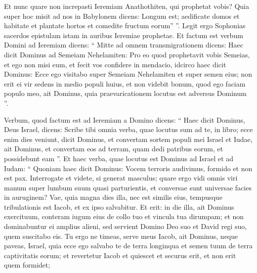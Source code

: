 \begin{biblechapter}
\begin{biblechapter}
\begin{biblechapter}
\begin{biblechapter}
\begin{biblechapter}
\begin{biblechapter}
\begin{biblechapter}
\begin{biblechapter}
\begin{biblechapter}
\begin{biblechapter}
\begin{biblechapter}
\begin{biblechapter}
\begin{biblechapter}
\begin{biblechapter}
\begin{biblechapter}
\begin{biblechapter}
\begin{biblechapter}
\begin{biblechapter}
\begin{biblechapter}
\begin{biblechapter}
\begin{biblechapter}
\begin{biblechapter}
\begin{biblechapter}
\begin{biblechapter}
\begin{biblechapter}
\begin{biblechapter}
\begin{biblechapter}
\begin{biblechapter}
\begin{biblechapter}
\verse Et nunc quare non increpasti Ieremiam Anathothiten, qui prophetat vobis? 
\verse Quia super hoc misit ad nos in Babylonem dicens: Longum est; aedificate domos et habitate et plantate hortos et comedite fructum eorum” ”.
 \verse Legit ergo Sophonias sacerdos epistulam istam in auribus Ieremiae prophetae. 
\verse Et factum est verbum Domini ad Ieremiam dicens: 
\verse “ Mitte ad omnem transmigrationem dicens: Haec dicit Dominus ad Semeiam Nehelamiten: Pro eo quod prophetavit vobis Semeias, et ego non misi eum, et fecit vos confidere in mendacio, 
\verse idcirco haec dicit Dominus: Ecce ego visitabo super Semeiam Nehelamiten et super semen eius; non erit ei vir sedens in medio populi huius, et non videbit bonum, quod ego faciam populo meo, ait Dominus, quia praevaricationem locutus est adversus Dominum ”.
 
\begin{biblechapter}
\verse Verbum, quod factum est ad Ieremiam a Domino dicens: 
\verse “ Haec dicit Dominus, Deus Israel, dicens: Scribe tibi omnia verba, quae locutus sum ad te, in libro; 
\verse ecce enim dies veniunt, dicit Dominus, et convertam sortem populi mei Israel et Iudae, ait Dominus, et convertam eos ad terram, quam dedi patribus eorum, et possidebunt eam ”. 
\verse Et haec verba, quae locutus est Dominus ad Israel et ad Iudam:
 \verse “ Quoniam haec dicit Dominus:
 Vocem terroris audivimus,
 formido et non est pax.
 \verse Interrogate et videte, si generat masculus;
 quare ergo vidi omnis viri manum
 super lumbum suum quasi parturientis,
 et conversae sunt universae facies in auruginem?
 \verse Vae, quia magna dies illa,
 nec est similis eius,
 tempusque tribulationis est Iacob,
 et ex ipso salvabitur.
 \verse Et erit: in die illa, ait Dominus exercituum, conteram iugum eius de collo tuo et vincula tua dirumpam; et non dominabuntur ei amplius alieni, 
\verse sed servient Domino Deo suo et David regi suo, quem suscitabo eis.
 \verse Tu ergo ne timeas, serve meus Iacob,
 ait Dominus,
 neque paveas, Israel,
 quia ecce ego salvabo te de terra longinqua
 et semen tuum de terra captivitatis eorum;
 et revertetur Iacob et quiescet
 et securus erit, et non erit quem formidet;

\end{biblechapter}
\end{biblechapter}
\end{biblechapter}
\end{biblechapter}
\end{biblechapter}
\end{biblechapter}
\end{biblechapter}
\end{biblechapter}
\end{biblechapter}
\end{biblechapter}
\end{biblechapter}
\end{biblechapter}
\end{biblechapter}
\end{biblechapter}
\end{biblechapter}
\end{biblechapter}
\end{biblechapter}
\end{biblechapter}
\end{biblechapter}
\end{biblechapter}
\end{biblechapter}
\end{biblechapter}
\end{biblechapter}
\end{biblechapter}
\end{biblechapter}
\end{biblechapter}
\end{biblechapter}
\end{biblechapter}
\end{biblechapter}
\end{biblechapter}
